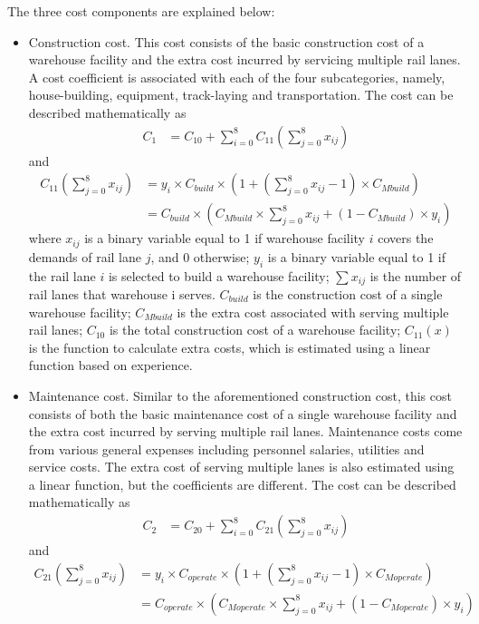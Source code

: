 The three cost components are explained below:
\begin{itemize}
	\item Construction cost. This cost consists of the basic construction cost of a warehouse facility and the extra cost incurred by servicing multiple rail lanes. 
	A cost coefficient is associated with each of the four subcategories, namely, house-building, equipment, track-laying and transportation. 
	The cost can be described mathematically as
	\begin{align}
		C_1 &= C_{10} + \sum_{i = 0}^{8}C_{11}(\sum_{j = 0}^{8}x_{ij})
	\end{align}
	and
	\begin{align}
		C_{11}(\sum_{j = 0}^{8}x_{ij}) &= y_i \times C_{build} \times (1 + (\sum_{j = 0}^{8}x_{ij} - 1) \times C_{Mbuild}) \\
		&= C_{build} \times (C_{Mbuild} \times \sum_{j = 0}^8 x_{ij} + (1 - C_{Mbuild})\times y_i)
	\end{align}
	where $x_{ij}$ is a binary variable equal to 1 if warehouse facility $i$ covers the demands of rail lane $j$, and 0 otherwise;
	$y_i$ is a binary variable equal to 1 if the rail lane $i$ is selected to build a warehouse facility;
	$\sum x_{ij}$ is the number of rail lanes that warehouse i serves.
	$C_{build}$ is the construction cost of a single warehouse facility;
	$C_{Mbuild}$ is the extra cost associated with serving multiple rail lanes;
	$C_{10}$ is the total construction cost of a warehouse facility;
	$C_{11}(x)$ is the function to calculate extra costs, which is estimated using a linear function based on experience.
	\item Maintenance cost. Similar to the aforementioned construction cost, this cost consists of both the basic maintenance cost of a single warehouse facility and the extra cost incurred by serving multiple rail lanes.
	Maintenance costs come from various general expenses including personnel salaries, utilities and service costs.
	The extra cost of serving multiple lanes is also estimated using a linear function, but the coefficients are different.
	The cost can be described mathematically as
	\begin{align}
		C_2 &= C_{20} + \sum_{i = 0}^{8}C_{21}(\sum_{j = 0}^{8}x_{ij})
	\end{align}
	and
	\begin{align}
		C_{21}(\sum_{j = 0}^{8}x_{ij}) &= y_i \times C_{operate} \times (1 + (\sum_{j = 0}^8 x_{ij} - 1) \times C_{Moperate}) \\
		&= C_{operate} \times (C_{Moperate} \times \sum_{j = 0}^8 x_{ij} + (1 - C_{Moperate}) \times y_i)

\end{align}
\end{itemize}
